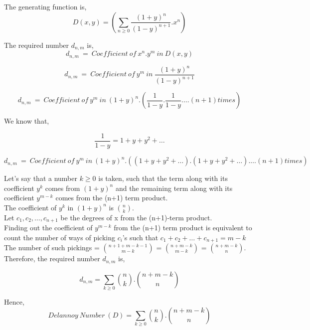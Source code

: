 The generating function is,
\begin{equation}
\boxed{D(x,y) = \left(\sum_{n \geq 0}{\frac{{(1+y)}^n}{{(1-y)}^{n+1}}}.x^n \right)}
\end{equation}

The required number $d_{n,m}$ is,\\

$$d_{n,m}~=~Coefficient~of~x^n.y^m~in~D(x,y)$$

$$d_{n,m}~=~Coefficient~of~y^m~in~{\frac{{(1+y)}^n}{{(1-y)}^{n+1}}}$$

$$d_{n,m}~=~Coefficient~of~y^m~in~ {(1+y)}^n.\left(\frac{1}{1-y}.\frac{1}{1-y}. \dots (n+1) times\right)$$

We know that,

$$\frac{1}{1-y} = 1+y+y^2+ \dots$$

$$d_{n,m}~=~Coefficient~of~y^m~in~{(1+y)}^n.\left((1+y+y^2+\dots).(1+y+y^2+\dots). \dots (n+1) times\right)$$

Let's say that a number $k \geq 0$ is taken, such that the term along with its coefficient $y^k$ comes from ${(1+y)^n}$ and the remaining term along with its coefficient $y^{m-k}$ comes from the (n+1) term product.\\

The coefficient of $y^k$ in ${(1+y)^n}$ is ${n \choose k}$.\\

Let $c_1,c_2,\dots,c_{n+1}$ be the degrees of x from the (n+1)-term product.\\

Finding out the coefficient of $y^{m-k}$ from the (n+1) term product is equivalent to count the number of ways of picking $c_i$'s such that $c_1+c_2+\dots+c_{n+1}=m-k$\\

The number of such pickings = ${{n+1+m-k-1} \choose {m-k}}$ = ${n+m-k} \choose {m-k}$ = ${n+m-k} \choose {n}$.\\

Therefore, the required number $d_{n,m}$ is,

$$d_{n,m} = \sum_{k \geq 0}{n \choose k}.{{n+m-k} \choose n}$$

Hence,
\begin{equation}
\boxed{Delannoy~Number~(D) = \sum_{k \geq 0}{n \choose k}.{{n+m-k} \choose n}}
\end{equation}























